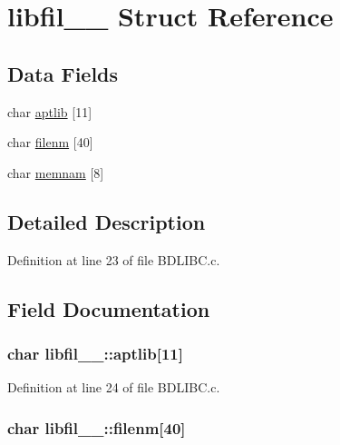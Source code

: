 \hypertarget{structlibfil__1__}{}\section{libfil\+\_\+\_\+ Struct Reference}
\label{structlibfil__1__}
\subsection*{Data Fields}
\begin{DoxyCompactItemize}
\item 
char \hyperlink{structlibfil__1___a1f80f03ec546886b16e5d743c27e5ae3}{aptlib} \mbox{[}11\mbox{]}
\item 
char \hyperlink{structlibfil__1___a26d8db4e7dc77167d62b167485d5d79e}{filenm} \mbox{[}40\mbox{]}
\item 
char \hyperlink{structlibfil__1___afaf3ccb11f0e1f5ee4ed34fefe5b740b}{memnam} \mbox{[}8\mbox{]}
\end{DoxyCompactItemize}


\subsection{Detailed Description}


Definition at line 23 of file B\+D\+L\+I\+B\+C.\+c.



\subsection{Field Documentation}
\subsubsection[{\texorpdfstring{aptlib}{aptlib}}]{\setlength{\rightskip}{0pt plus 5cm}char libfil\+\_\+\_\+\+::aptlib\mbox{[}11\mbox{]}}\hypertarget{structlibfil__1___a1f80f03ec546886b16e5d743c27e5ae3}{}\label{structlibfil__1___a1f80f03ec546886b16e5d743c27e5ae3}


Definition at line 24 of file B\+D\+L\+I\+B\+C.\+c.

\subsubsection[{\texorpdfstring{filenm}{filenm}}]{\setlength{\rightskip}{0pt plus 5cm}char libfil\+\_\+\_\+\+::filenm\mbox{[}40\mbox{]}}\hypertarget{structlibfil__1___a26d8db4e7dc77167d62b167485d5d79e}{}\label{structlibfil__1___a26d8db4e7dc77167d62b167485d5d79e}


